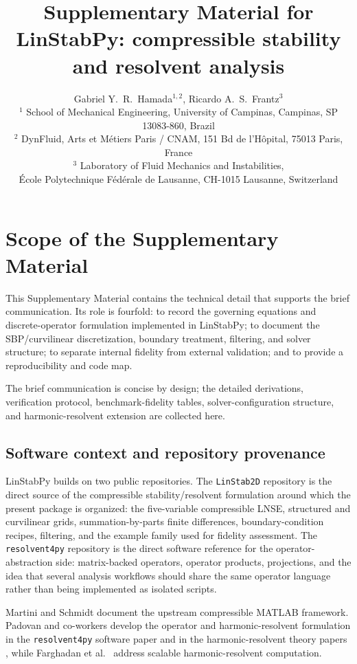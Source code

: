 \documentclass[11pt]{article}
\title{Supplementary Material for\\LinStabPy: compressible stability and resolvent analysis}
\author{%
Gabriel Y.~R.~Hamada$^{1,2}$, Ricardo A.~S.~Frantz$^{3}$\\[0.75em]
\small $^{1}$ School of Mechanical Engineering, University of Campinas, Campinas, SP 13083-860, Brazil\\
\small $^{2}$ DynFluid, Arts et M\'etiers Paris / CNAM, 151 Bd de l'H\^opital, 75013 Paris, France\\
\small $^{3}$ Laboratory of Fluid Mechanics and Instabilities,\\
\small \'Ecole Polytechnique F\'ed\'erale de Lausanne, CH-1015 Lausanne, Switzerland%
}
\date{}
\begin{document}
\maketitle

\section{Scope of the Supplementary Material}

This Supplementary Material contains the technical detail that supports the
brief communication. Its role is fourfold: to record the governing equations
and discrete-operator formulation implemented in LinStabPy; to document the
SBP/curvilinear discretization, boundary treatment, filtering, and solver
structure; to separate internal fidelity from external validation; and to
provide a reproducibility and code map.

The brief communication is concise by design; the detailed derivations,
verification protocol, benchmark-fidelity tables, solver-configuration
structure, and harmonic-resolvent extension are collected here.

\subsection{Software context and repository provenance}

LinStabPy builds on two public repositories. The \texttt{LinStab2D} repository
\citep{linstab2drepo,martini2024} is the direct source of the compressible
stability/resolvent formulation around which the present package is organized:
the five-variable compressible LNSE, structured and curvilinear grids,
summation-by-parts finite differences, boundary-condition recipes, filtering,
and the example family used for fidelity assessment. The
\texttt{resolvent4py} repository
\citep{resolvent4pyrepo,padovan2025resolvent4py,resolvent4pycgl} is the direct
software reference for the operator-abstraction side: matrix-backed operators,
operator products, projections, and the idea that several analysis workflows
should share the same operator language rather than being implemented as
isolated scripts.

Martini and Schmidt \citep{martini2024} document the upstream compressible
MATLAB framework. Padovan and co-workers develop the operator and
harmonic-resolvent formulation in the \texttt{resolvent4py} software paper
\citep{padovan2025resolvent4py} and in the harmonic-resolvent theory papers
\citep{padovan2020harmonic,padovan2022subharmonic}, while Farghadan et al.\
\citep{farghadan2025timestepping} address scalable harmonic-resolvent
computation.
\end{document}
